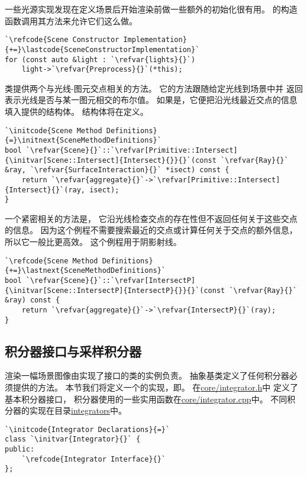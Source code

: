 一些光源实现发现在定义场景后开始渲染前做一些额外的初始化很有用。
的构造函数调用其方法来允许它们这么做。
\begin{lstlisting}
`\refcode{Scene Constructor Implementation}{+=}\lastcode{SceneConstructorImplementation}`
for (const auto &light : `\refvar{lights}{}`)
    light->`\refvar{Preprocess}{}`(*this);
\end{lstlisting}

类提供两个与光线-图元交点相关的方法。
它的方法跟随给定光线到场景中并
返回表示光线是否与某一图元相交的布尔值。
如果是，它便把沿光线最近交点的信息填入提供的结构体。
结构体将在定义。
\begin{lstlisting}
`\initcode{Scene Method Definitions}{=}\initnext{SceneMethodDefinitions}`
bool `\refvar{Scene}{}`::`\refvar[Primitive::Intersect]{\initvar[Scene::Intersect]{Intersect}{}}{}`(const `\refvar{Ray}{}` &ray, `\refvar{SurfaceInteraction}{}` *isect) const {
    return `\refvar{aggregate}{}`->`\refvar[Primitive::Intersect]{Intersect}{}`(ray, isect);
}
\end{lstlisting}
一个紧密相关的方法是，
它沿光线检查交点的存在性但不返回任何关于这些交点的信息。
因为这个例程不需要搜索最近的交点或计算任何关于交点的额外信息，
所以它一般比更高效。
这个例程用于阴影射线。
\begin{lstlisting}
`\refcode{Scene Method Definitions}{+=}\lastnext{SceneMethodDefinitions}`
bool `\refvar{Scene}{}`::`\refvar[IntersectP]{\initvar[Scene::IntersectP]{IntersectP}{}}{}`(const `\refvar{Ray}{}` &ray) const {
    return `\refvar{aggregate}{}`->`\refvar{IntersectP}{}`(ray);
}
\end{lstlisting}

\subsection{积分器接口与采样积分器}\label{sub:积分器接口与采样积分器}
渲染一幅场景图像由实现了接口的类的实例负责。
抽象基类定义了任何积分器必须提供的方法。
本节我们将定义一个的实现，即。
在\href{https://github.com/mmp/pbrt-v3/tree/master/src/core/integrator.h}{\ttfamily core/integrator.h}中
定义了基本积分器接口，
积分器使用的一些实用函数在\href{https://github.com/mmp/pbrt-v3/blob/master/src/core/integrator.cpp}{\ttfamily core/integrator.cpp}中。
不同积分器的实现在目录\href{https://github.com/mmp/pbrt-v3/tree/master/src/integrators}{\ttfamily integrators}中。
\begin{lstlisting}
`\initcode{Integrator Declarations}{=}`
class `\initvar{Integrator}{}` {
public:
    `\refcode{Integrator Interface}{}`
};
\end{lstlisting}

